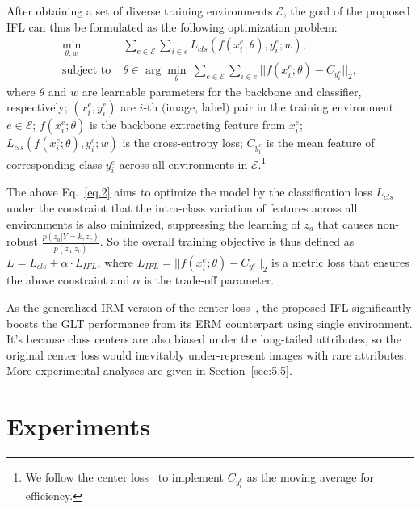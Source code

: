 \documentclass{article}
\begin{document}
After obtaining a set of diverse training environments $\mathcal{E}$, the goal of the proposed IFL can thus be formulated as the following optimization problem:
\begin{equation}
    \label{eq.2}
    \begin{split}
         \min_{\theta, w} \; & \sum_{e\in\mathcal{E}} \sum_{i\in e} L_{cls}(f(x_i^e;\theta), y_i^e; w),\\
        \text{subject to} \; & \theta \in \arg\min_\theta \; \sum_{e\in\mathcal{E}} \sum_{i \in e} ||  f(x_i^e;\theta) - C_{y_i^e} ||_2, 
    \end{split}
\end{equation}
where $\theta$ and $w$ are learnable parameters for the backbone and classifier, respectively; $(x_i^e, y_i^e)$ are $i$-th $($image, label$)$ pair in the training environment $e\in \mathcal{E}$; $f(x_i^e;\theta)$ is the backbone extracting feature from $x_i^e$; $L_{cls}(f(x_i^e;\theta), y_i^e; w)$ is the cross-entropy loss;  $C_{y_i^e}$ is the mean feature of corresponding class $y_i^e$ across all environments in $\mathcal{E}$.\footnote{We follow the center loss~\cite{wen2016centerloss} to implement $C_{y_i^e}$ as the moving average for efficiency.}



The above Eq.~\eqref{eq.2} aims to optimize the model by the classification loss $L_{cls}$ under the constraint that the intra-class variation of features across all environments is also minimized, suppressing the learning of $z_a$ that causes non-robust $\frac{p(z_a|Y=k,z_c)}{p(z_a|z_c)}$. So the overall training objective is thus defined as $L= L_{cls} + \alpha \cdot L_{IFL}$, where $L_{IFL} = ||  f(x_i^e;\theta) - C_{y_i^e} ||_2$ is a metric loss that ensures the above constraint and $\alpha$ is the trade-off parameter. 

As the generalized IRM version of the center loss~\cite{wen2016centerloss}, the proposed IFL significantly boosts the GLT performance from its ERM counterpart using single environment. It's because class centers are also biased under the long-tailed attributes, so the original center loss would inevitably under-represent images with rare attributes.  More experimental analyses are given in Section~\ref{sec:5.5}. 







 


\section{Experiments}
\label{sec:5}
\end{document}
